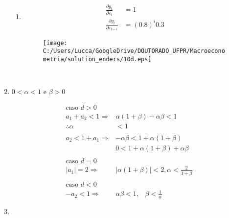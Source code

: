 \begin{enumerate}
\begin{enumerate}
		\item %
		\begin{align*}
			\frac{\partial y_t}{\partial \varepsilon_t}&=1\\
			\frac{\partial y_t}{\partial \varepsilon_{t-i}}&=(0.8)^i0.3
		\end{align*}
		\begin{figure}[h]
			\centering
			\texttt{[image: C:/Users/Lucca/GoogleDrive/DOUTORADO\_UFPR/Macroeconometria/solution\_enders/10d.eps]}
		\end{figure}
		\
	\end{enumerate}
	\pagebreak
	\item %
	$0<\alpha<1$  e $\beta>0$
	
	\begin{align*}
		\text{caso }d>0 \\
	a_1+a_2<1 \Rightarrow&	\alpha(1+\beta)-\alpha \beta<1\\
		\therefore \alpha&<1\\
		\\		
		a_2<1+a_1 \Rightarrow& -\alpha \beta<1+\alpha(1+\beta)\\
		& 0<1+\alpha(1+\beta)+\alpha \beta\\
		\\
		\text{caso }d=0\\
		|a_1|=2\Rightarrow& |\alpha (1+\beta)|<2, \alpha<\frac{2}{1+\beta}\\
		\\
		\text{caso } d<0\\
		-a_2<1 \Rightarrow& \alpha \beta <1, \;\;\; \beta<\frac{1}{\alpha}
	\end{align*}
		
		
		\item %
		

\end{enumerate}
